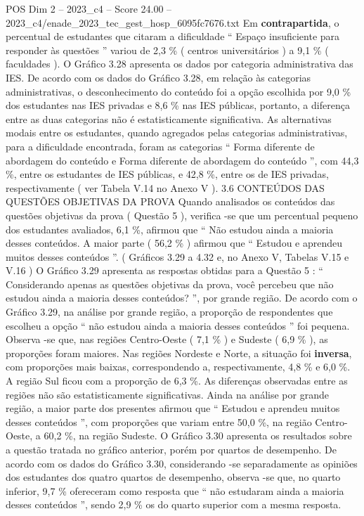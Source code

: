 \begin{textsample}{POS Dim 2 – 2023\_c4 – Score 24.00 – 2023\_c4/enade\_2023\_tec\_gest\_hosp\_6095fc7676.txt}
Em \textbf{contrapartida}, o percentual de estudantes que citaram a dificuldade “ Espaço insuficiente para responder às questões ” variou de 2,3 \% ( centros universitários ) a 9,1 \% ( faculdades ).
O Gráfico 3.28 apresenta os dados por categoria administrativa das IES.
De acordo com os dados do Gráfico 3.28, em relação às categorias administrativas, o desconhecimento do conteúdo foi a opção escolhida por 9,0 \% dos estudantes nas IES privadas e 8,6 \% nas IES públicas, portanto, a diferença entre as duas categorias não é estatisticamente significativa.
As alternativas modais entre os estudantes, quando agregados pelas categorias administrativas, para a dificuldade encontrada, foram as categorias “ Forma diferente de abordagem do conteúdo e Forma diferente de abordagem do conteúdo ”, com 44,3 \%, entre os estudantes de IES públicas, e 42,8 \%, entre os de IES privadas, respectivamente ( ver Tabela V.14 no Anexo V ). 3.6 CONTEÚDOS DAS QUESTÕES OBJETIVAS DA PROVA Quando analisados os conteúdos das questões objetivas da prova ( Questão 5 ), verifica -se que um percentual pequeno dos estudantes avaliados, 6,1 \%, afirmou que “ Não estudou ainda a maioria desses conteúdos.
A maior parte ( 56,2 \% ) afirmou que “ Estudou e aprendeu muitos desses conteúdos ”. ( Gráficos 3.29 a 4.32 e, no Anexo V, Tabelas V.15 e V.16 ) O Gráfico 3.29 apresenta as respostas obtidas para a Questão 5 : “ Considerando apenas as questões objetivas da prova, você percebeu que não estudou ainda a maioria desses conteúdos? ”, por grande região.
De acordo com o Gráfico 3.29, na análise por grande região, a proporção de respondentes que escolheu a opção “ não estudou ainda a maioria desses conteúdos ” foi pequena.
Observa -se que, nas regiões Centro-Oeste ( 7,1 \% ) e Sudeste ( 6,9 \% ), as proporções foram maiores.
Nas regiões Nordeste e Norte, a situação foi \textbf{inversa}, com proporções mais baixas, correspondendo a, respectivamente, 4,8 \% e 6,0 \%.
A região Sul ficou com a proporção de 6,3 \%.
As diferenças observadas entre as regiões não são estatisticamente significativas.
Ainda na análise por grande região, a maior parte dos presentes afirmou que “ Estudou e aprendeu muitos desses conteúdos ”, com proporções que variam entre 50,0 \%, na região Centro-Oeste, a 60,2 \%, na região Sudeste.
O Gráfico 3.30 apresenta os resultados sobre a questão tratada no gráfico anterior, porém por quartos de desempenho.
De acordo com os dados do Gráfico 3.30, considerando -se separadamente as opiniões dos estudantes dos quatro quartos de desempenho, observa -se que, no quarto inferior, 9,7 \% ofereceram como resposta que “ não estudaram ainda a maioria desses conteúdos ”, sendo 2,9 \% os do quarto superior com a mesma resposta.

\end{textsample}
